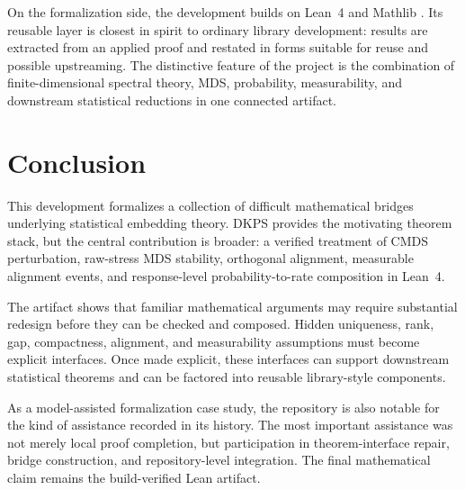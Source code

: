 \documentclass[11pt]{article}
\newcommand{\Lean}{Lean~4\xspace}
\newcommand{\Mathlib}{Mathlib\xspace}
\begin{document}
On the formalization side, the development builds on \Lean and \Mathlib
\cite{demoura2015lean,mathlib2020}.  Its reusable layer is closest in spirit to
ordinary library development: results are extracted from an applied proof and
restated in forms suitable for reuse and possible upstreaming.  The distinctive
feature of the project is the combination of finite-dimensional spectral theory,
MDS, probability, measurability, and downstream statistical reductions in one
connected artifact.

\section{Conclusion}

This development formalizes a collection of difficult mathematical bridges
underlying statistical embedding theory.  DKPS provides the motivating theorem
stack, but the central contribution is broader: a verified treatment of CMDS
perturbation, raw-stress MDS stability, orthogonal alignment, measurable
alignment events, and response-level probability-to-rate composition in \Lean.

The artifact shows that familiar mathematical arguments may require substantial
redesign before they can be checked and composed.  Hidden uniqueness, rank, gap,
compactness, alignment, and measurability assumptions must become explicit
interfaces.  Once made explicit, these interfaces can support downstream
statistical theorems and can be factored into reusable library-style components.

As a model-assisted formalization case study, the repository is also notable for
the kind of assistance recorded in its history.  The most important assistance
was not merely local proof completion, but participation in theorem-interface
repair, bridge construction, and repository-level integration.  The final
mathematical claim remains the build-verified Lean artifact.
\end{document}
